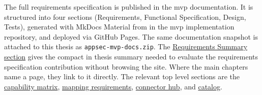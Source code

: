 The full requirements specification is published in the \gls{mvp} documentation. It is structured into four sections (Requirements, Functional Specification, Design, Tests), generated with MkDocs Material from  in the \gls{mvp} implementation repository, and deployed via GitHub Pages. The same documentation snapshot is attached to this thesis as \texttt{appsec-mvp-docs.zip}. The \hyperref[sec:req-summary]{Requirements Summary section} gives the compact in thesis summary needed to evaluate the requirements specification contribution without browsing the site. Where the main chapters name a page, they link to it directly. The relevant top level sections are the \href{https://vkraus.github.io/appsec-mvp/platform/reference/source-capability-matrix/}{capability matrix}, \href{https://vkraus.github.io/appsec-mvp/platform/reference/canonical-mapping/}{mapping requirements}, \href{https://vkraus.github.io/appsec-mvp/connectors/}{connector hub}, and \href{https://vkraus.github.io/appsec-mvp/platform/reference/catalog/}{catalog}.
